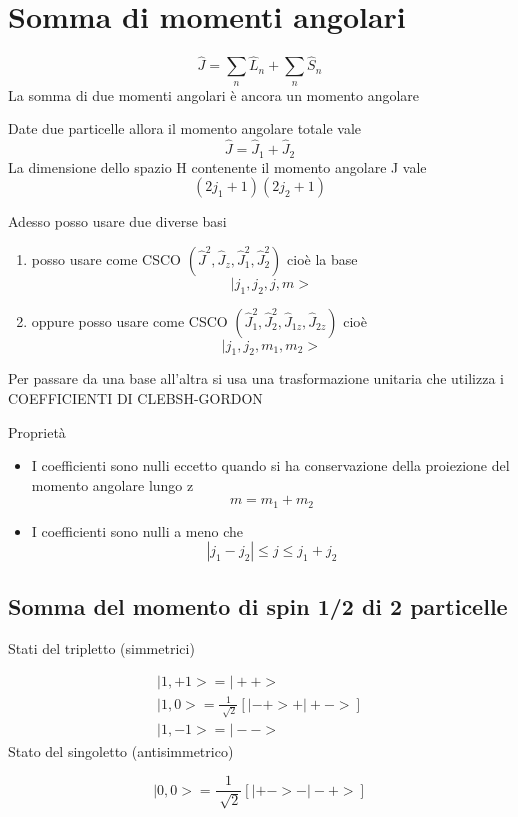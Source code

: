 \chapter{Somma di momenti angolari}

\begin{equation*}
    \hat{J} = \sum_n \hat{L}_n + \sum_n \hat{S}_n
\end{equation*}
La somma di due momenti angolari è ancora un momento angolare

\noindent Date due particelle allora il momento angolare totale vale
\begin{equation*}
    \hat{J} = \hat{J}_1 + \hat{J}_2
\end{equation*}
La dimensione dello spazio H contenente il momento angolare J vale 
\begin{equation*}
    (2j_1+1)(2j_2+1)
\end{equation*}

\noindent Adesso posso usare due diverse basi
\begin{enumerate}
    \item posso usare come CSCO \((\hat{J}^2, \hat{J}_z, \hat{J}^2_1, \hat{J}^2_2)\) cioè la base 
    \begin{equation*}
        |j_1,j_2,j,m>
    \end{equation*}
    \item oppure posso usare come CSCO \((\hat{J}^2_1,\hat{J}^2_2, \hat{J}_{1z},\hat{J}_{2z})\) cioè
    \begin{equation*}
        |j_1,j_2,m_1,m_2>
    \end{equation*}
\end{enumerate}
Per passare da una base all'altra si usa una trasformazione unitaria che utilizza i COEFFICIENTI DI CLEBSH-GORDON

\noindent Proprietà
\begin{itemize}
    \item I coefficienti sono nulli eccetto quando si ha conservazione della proiezione del momento angolare lungo z
    \begin{equation*}
        m = m_1+m_2
    \end{equation*}
    \item I coefficienti sono nulli a meno che 
    \begin{equation*}
        |j_1-j_2| \leq j \leq j_1+j_2
    \end{equation*}
\end{itemize}

\section{Somma del momento di spin 1/2 di 2 particelle}

Stati del tripletto (simmetrici)

\begin{gather*}
    |1,+1> = |++> \\
    |1,0> = \frac{1}{\sqrt[]{2}}[|-+>+|+->] \\
    |1,-1> = |--> 
\end{gather*}
Stato del singoletto (antisimmetrico)

\begin{equation*}
    |0,0> = \frac{1}{\sqrt[]{2}}[|+-> - |-+> ]
\end{equation*}